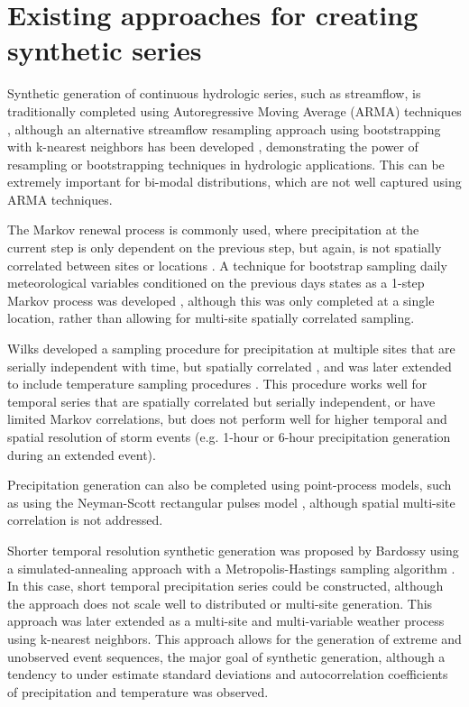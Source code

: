 \documentclass[11pt]{article} %
\begin{document}
\section{Existing approaches for creating synthetic series}

Synthetic generation of continuous hydrologic series, such as streamflow, is traditionally completed using Autoregressive Moving Average (ARMA) techniques \cite{Salas1980}, although an alternative streamflow resampling approach using bootstrapping with k-nearest neighbors has been developed \cite{Lall1996}, demonstrating the power of resampling or bootstrapping techniques \cite{Efron1998} in hydrologic applications. This can be extremely important for bi-modal distributions, which are not well captured using ARMA techniques.

The Markov renewal process is commonly used, where precipitation at the current step is only dependent on the previous step, but again, is not spatially correlated between sites or locations \cite{Foufoula-Georgiou1987}. A technique for bootstrap sampling daily meteorological variables conditioned on the previous days states as a 1-step Markov process was developed \cite{Rajagopalan1999}, although this was only completed at a single location, rather than allowing for multi-site spatially correlated sampling.

Wilks developed a sampling procedure for precipitation at multiple sites that are serially independent with time, but spatially correlated \cite{Wilks1998}, and was later extended to include temperature sampling procedures \cite{Wilks1999}. This procedure works well for temporal series that are spatially correlated but serially independent, or have limited Markov correlations, but does not perform well for higher temporal and spatial resolution of storm events (e.g. 1-hour or 6-hour precipitation generation during an extended event). 

Precipitation generation can also be completed using point-process models, such as using the Neyman-Scott rectangular pulses model \cite{Rodriguez-Iturbe1987}, although spatial multi-site correlation is not addressed.

Shorter temporal resolution synthetic generation was proposed by Bardossy using a simulated-annealing approach with a Metropolis-Hastings sampling algorithm \cite{Bardossy1998}. In this case, short temporal precipitation series could be constructed, although the approach does not scale well to distributed or multi-site generation. This approach was later extended as a multi-site and multi-variable weather process \cite{Buishand2001} using k-nearest neighbors. This approach allows for the generation of extreme and unobserved event sequences, the major goal of synthetic generation, although a tendency to under estimate standard deviations and autocorrelation coefficients of precipitation and temperature was observed. 
\end{document}
